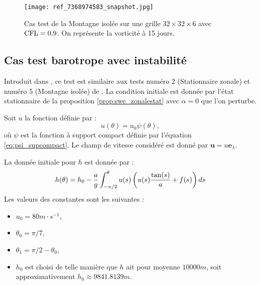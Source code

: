 \begin{figure}[htbp]
\begin{center}
\texttt{[image: ref\_7368974583\_snapshot.jpg]}
\end{center}
\caption{Cas test de la Montagne isolée \cite{Williamson1992} sur une grille $32 \times 32 \times 6$ avec $\text{CFL}=0.9$. On représente la vorticité à 15 jours.}
\label{fig: williamson 5 vorticité}
\end{figure}





















\subsection{Cas test barotrope avec instabilité}

Introduit dans \cite{Galewsky2004}, ce test est similaire aux tests numéro 2 (Stationnaire zonale) et numéro 5 (Montagne isolée) de \cite{Williamson1992}. La condition initiale est donnée par l'état stationnaire de la proposition \ref{prop:swe_zonalestat} avec $\alpha=0$ que l'on perturbe.

Soit $u$ la fonction définie par :
\begin{equation}
u(\theta) = u_{0} \psi(\theta),
\end{equation}
où $\psi$ est la fonction à support compact définie par l'équation \eqref{eq:psi_supcompact}. Le champ de vitesse considéré est donné par $\mathbf{u} = u \mathbf{e}_{\lambda}$.

La donnée initiale pour $h$ est donnée par :
\begin{equation}
h(\theta) = h_0 - \dfrac{a}{g} \displaystyle\int^{\theta}_{-\pi/2} u(s) \left( u(s) \dfrac{\tan (s)}{a} + f(s) \right) ds
\end{equation}
Les valeurs des constantes sont les suivantes :
\begin{itemize}
\item $u_{0}=80 \si{m} \cdot  \si{s^{-1}}$,
\item $\theta_0 = \pi/7$,
\item $\theta_1 = \pi/2 - \theta_0$,
\item $h_0$ est choisi de telle manière que $h$ ait pour moyenne $10000 \si{m}$, soit approximativement $h_0 \approx 9841.8139 \si{m}$.
\end{itemize}

